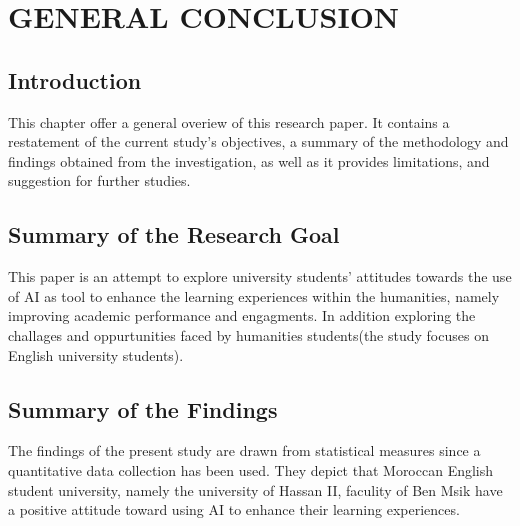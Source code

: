 \chapter{GENERAL CONCLUSION}
\section{Introduction}
This chapter offer a general overiew of this research paper.
It contains a restatement of the current study's objectives, a summary of 
the methodology and findings obtained from the investigation, as well as it provides
limitations, and suggestion for further studies.

\section{Summary of the Research Goal}
This paper is an attempt to explore university students’ attitudes towards the use of
AI as tool to enhance the learning experiences within the humanities, namely improving
academic performance and engagments. In addition exploring the challages and oppurtunities
faced by humanities students(the study focuses on English university students).

\section{Summary of the Findings}
The findings of the present study are drawn from statistical measures since a
quantitative data collection has been used. They depict 
that Moroccan English student university, namely the university of Hassan II, faculity of Ben
Msik have a positive attitude toward using AI to enhance their learning experiences.
 

